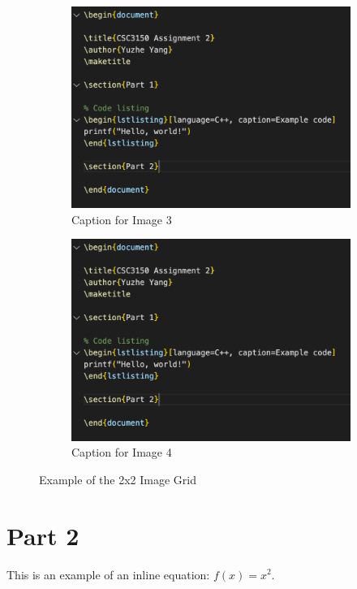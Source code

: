\documentclass[12pt,a4paper]{report}
\begin{document}
\begin{figure}[h]
    \begin{subfigure}{0.4\textwidth}
        \centering
        \includegraphics[width=\textwidth]{src/example.png}
        \caption{Caption for Image 3}
    \end{subfigure}
    \hfill
    \begin{subfigure}{0.4\textwidth}
        \centering
        \includegraphics[width=\textwidth]{src/example.png}
        \caption{Caption for Image 4}
    \end{subfigure}

    \caption{Example of the 2x2 Image Grid}
\end{figure}

\section{Part 2}
This is an example of an inline equation: $f(x)=x^2$.
\end{document}
